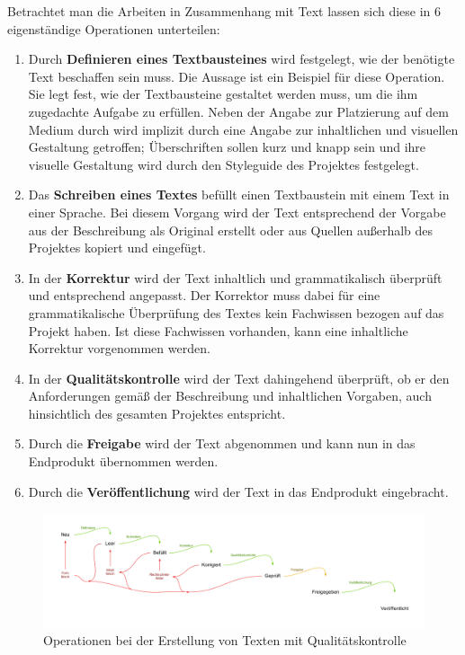 Betrachtet man die Arbeiten in Zusammenhang mit Text lassen sich diese in 6 eigenständige Operationen unterteilen:

\begin{enumerate}
\item{Durch \textbf{Definieren eines Textbausteines} wird festgelegt, wie der benötigte Text beschaffen sein muss. Die Aussage  ist ein Beispiel für diese Operation. Sie legt fest, wie der Textbausteine gestaltet werden muss, um die ihm zugedachte Aufgabe zu erfüllen. Neben der Angabe zur Platzierung auf dem Medium durch  wird implizit durch  eine Angabe zur inhaltlichen und visuellen Gestaltung getroffen; Überschriften sollen kurz und knapp sein und ihre visuelle Gestaltung wird durch den Styleguide des Projektes festgelegt.}
\item{Das \textbf{Schreiben eines Textes} befüllt einen Textbaustein mit einem Text in einer Sprache. Bei diesem Vorgang wird der Text entsprechend der Vorgabe aus der Beschreibung als Original erstellt oder aus Quellen außerhalb des Projektes kopiert und eingefügt. }
\item{In der \textbf{Korrektur} wird der Text inhaltlich und grammatikalisch überprüft und entsprechend angepasst. Der Korrektor muss dabei für eine grammatikalische Überprüfung des Textes kein Fachwissen bezogen auf das Projekt haben. Ist diese Fachwissen vorhanden, kann eine inhaltliche Korrektur vorgenommen werden.}
\item{In der \textbf{Qualitätskontrolle} wird der Text dahingehend überprüft, ob er den Anforderungen gemäß der Beschreibung und inhaltlichen Vorgaben, auch hinsichtlich des gesamten Projektes entspricht. }
\item{Durch die \textbf{Freigabe} wird der Text abgenommen und kann nun in das Endprodukt übernommen werden.}
\item{Durch die \textbf{Veröffentlichung} wird der Text in das Endprodukt eingebracht.}
\end{enumerate}

\begin{figure}[htb]
\begin{center}
\includegraphics[width=\textwidth]{media/chart-4.pdf}
\end{center}
\caption{Operationen bei der Erstellung von Texten mit Qualitätskontrolle}
\label{chart:4}
\end{figure}


